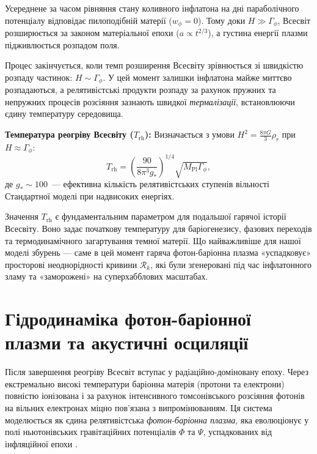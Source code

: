\documentclass[12pt, a4paper]{article}
\begin{document}
Усереднене за часом рівняння стану коливного інфлатона на дні параболічного потенціалу відповідає пилоподібній матерії ($w_\phi = 0$). Тому доки $H \gg \Gamma_\phi$, Всесвіт розширюється за законом матеріальної епохи ($a \propto t^{2/3}$), а густина енергії плазми підживлюється розпадом поля.



Процес закінчується, коли темп розширення Всесвіту зрівнюється зі швидкістю розпаду частинок: $H \sim \Gamma_\phi$. У цей момент залишки інфлатона майже миттєво розпадаються, а релятивістські продукти розпаду за рахунок пружних та непружних процесів розсіяння зазнають швидкої \emph{термалізації}, встановлюючи єдину температуру середовища.

\begin{keybox}
\textbf{Температура реогріву Всесвіту ($T_{\mathrm{rh}}$):}
Визначається з умови $H^2 = \frac{8\pi G}{3}\rho_r$ при $H \approx \Gamma_\phi$:
\begin{equation}\label{eq:t_reheating}
  T_{\mathrm{rh}} = \left( \frac{90}{8\pi^3 g_*} \right)^{1/4} \sqrt{M_{\mathrm{Pl}}\Gamma_\phi},
\end{equation}
де $g_* \sim 100$~--- ефективна кількість релятивістських ступенів вільності Стандартної моделі при надвисоких енергіях.
\end{keybox}

Значення $T_{\mathrm{rh}}$ є фундаментальним параметром для подальшої гарячої історії Всесвіту. Воно задає початкову температуру для баріогенезису, фазових переходів та термодинамічного загартування темної матерії. Що найважливіше для нашої моделі збурень — саме в цей момент гаряча фотон-баріонна плазма «успадковує» просторові неоднорідності кривини $\mathcal{R}_k$, які були згенеровані під час інфлатонного зламу та «заморожені» на суперхабблових масштабах.

\section{Гідродинаміка фотон-баріонної плазми та акустичні осциляції}

Після завершення реогріву Всесвіт вступає у радіаційно-доміновану епоху. Через екстремально високі температури баріонна матерія (протони та електрони) повністю іонізована і за рахунок інтенсивного томсонівського розсіяння фотонів на вільних електронах міцно пов'язана з випромінюванням. Ця система моделюється як єдина релятивістська \emph{фотон-баріонна плазма}, яка еволюціонує у полі ньютонівських гравітаційних потенціалів $\Phi$ та $\Psi$, успадкованих від інфляційної епохи \cite{mukhanov_2005}.
\end{document}
